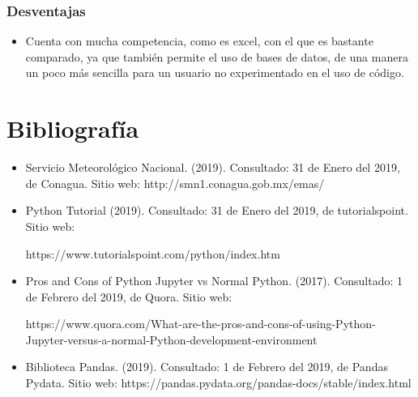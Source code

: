 \documentclass{article}
\begin{document}
\subsubsection{Desventajas}
\begin{itemize}
\item Cuenta con mucha competencia, como es excel, con el que es bastante comparado, ya que también permite el uso de bases de datos, de una manera un poco más sencilla para un usuario no experimentado en el uso de código. 
\end{itemize}


\section{Bibliografía}

\begin{itemize}
    \item Servicio Meteorológico Nacional. (2019). Consultado: 31 de Enero del 2019, de Conagua. Sitio web: http://smn1.conagua.gob.mx/emas/
    \item Python Tutorial (2019). Consultado: 31 de Enero del 2019, de tutorialspoint. Sitio web:
    
    https://www.tutorialspoint.com/python/index.htm
    \item Pros and Cons of Python Jupyter vs Normal Python. (2017). Consultado: 1 de Febrero del 2019, de Quora. Sitio web:
    
    https://www.quora.com/What-are-the-pros-and-cons-of-using-Python-Jupyter-versus-a-normal-Python-development-environment
    
    \item Biblioteca Pandas. (2019). Consultado: 1 de Febrero del 2019, de Pandas Pydata. Sitio web: https://pandas.pydata.org/pandas-docs/stable/index.html
    
\end{itemize}
\end{document}
